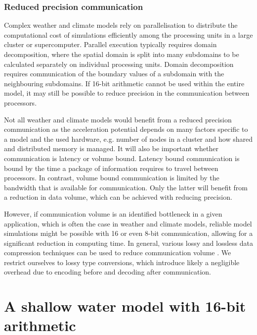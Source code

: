 \documentclass[draft]{agujournal2019}
\begin{document}
\subsubsection{Reduced precision communication}

Complex weather and climate models rely on parallelisation to distribute the
computational cost of simulations efficiently among the processing units in a
large cluster or supercomputer. Parallel execution typically requires domain
decomposition, where the spatial domain is split into many subdomains to be
calculated separately on individual processing units. Domain decomposition
requires communication of the boundary values of a subdomain with the
neighbouring subdomains. If 16-bit arithmetic cannot be used within the
entire model, it may still be possible to reduce precision in the communication
between processors.

Not all weather and climate models would benefit from a reduced precision
communication as the acceleration potential depends on many factors specific
to a model and the used hardware, e.g. number of nodes in a cluster and how
shared and distributed memory is managed. It will also be important
whether communication is latency or volume bound. Latency bound communication is
bound by the time a package of information requires to travel between processors.
In contrast, volume bound communication is limited by the bandwidth that is
available for communication. Only the latter will benefit from a reduction in data
volume, which can be achieved with reducing precision.

However, if communication volume is an identified bottleneck in a given application,
which is often the case in weather and climate models, reliable model simulations
might be possible with 16 or even 8-bit communication, allowing for a significant
reduction in computing time. In general, various lossy and lossless data compression
techniques can be used to reduce communication volume \cite{Fan2019}. We restrict
ourselves to lossy type conversions, which introduce likely a negligible overhead
due to encoding before and decoding after communication.

\section{A shallow water model with 16-bit arithmetic}
\label{sec:swm}
\end{document}
